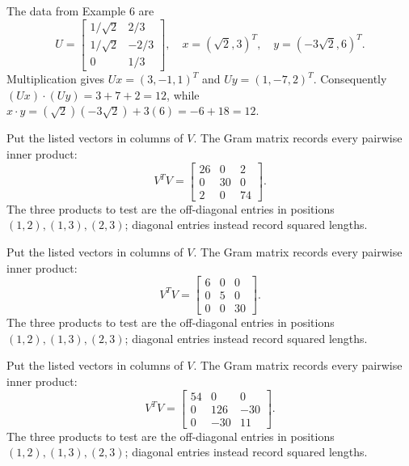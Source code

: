 The data from Example 6 are
\[
U=\begin{bmatrix}1/\sqrt2&2/3\\1/\sqrt2&-2/3\\0&1/3\end{bmatrix},
\quad x=(\sqrt2,3)^T,\quad y=(-3\sqrt2,6)^T.
\]
Multiplication gives $Ux=(3,-1,1)^T$ and $Uy=(1,-7,2)^T$.
Consequently $(Ux)\cdot(Uy)=3+7+2=12$, while
$x\cdot y=(\sqrt2)(-3\sqrt2)+3(6)=-6+18=12$.

Put the listed vectors in columns of $V$. The Gram matrix records every pairwise inner product:
\[V^TV=\left[\begin{array}{rrr}26&0&2\\0&30&0\\2&0&74\end{array}\right].\]
The three products to test are the off-diagonal entries in positions $(1,2),(1,3),(2,3)$; diagonal entries instead record squared lengths.

Put the listed vectors in columns of $V$. The Gram matrix records every pairwise inner product:
\[V^TV=\left[\begin{array}{rrr}6&0&0\\0&5&0\\0&0&30\end{array}\right].\]
The three products to test are the off-diagonal entries in positions $(1,2),(1,3),(2,3)$; diagonal entries instead record squared lengths.

Put the listed vectors in columns of $V$. The Gram matrix records every pairwise inner product:
\[V^TV=\left[\begin{array}{rrr}54&0&0\\0&126&-30\\0&-30&11\end{array}\right].\]
The three products to test are the off-diagonal entries in positions $(1,2),(1,3),(2,3)$; diagonal entries instead record squared lengths.

